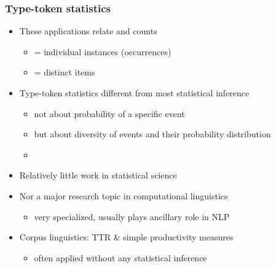 \documentclass[t]{beamer} %
\begin{document}
\begin{frame}
  \frametitle{Type-token statistics}

  \begin{itemize}
  \item These applications relate  and  counts
    \begin{itemize}
    \item {} = individual instances (occurrences)
    \item {} = distinct items
    \end{itemize}
  \item Type-token statistics different from most statistical inference
    \begin{itemize}
    \item not about probability of a specific event
    \item but about diversity of events and their probability distribution
    \item[]\pause
    \end{itemize}
  \item Relatively little work in statistical science
  \item Nor a major research topic in computational linguistics
    \begin{itemize}
    \item very specialized, usually plays ancillary role in NLP
    \end{itemize}
  \item Corpus linguistics: TTR \& simple productivity measures
    \begin{itemize}
    \item often applied without any statistical inference
    \end{itemize}
  \end{itemize}
\end{frame}
\end{document}
